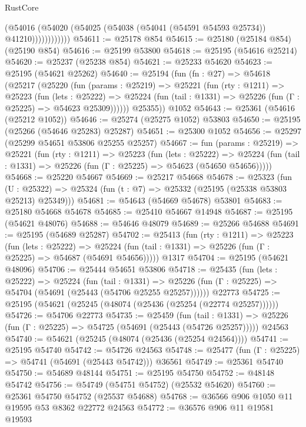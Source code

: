 \begin{lexlean}{RustCore}
\begin{coremodule}
                    (@54016
                      (@54020 (@54025 (@54038 (@54041 (@54591 @54593 @25734)) @41210))))))))))))
@54611 := @25178 @854
@54615 := @25180 (@25184 @854) (@25190 @854)
@54616 := @25199 @53800
@54618 := @25195 (@54616 @25214)
@54620 := @25237 (@25238 @854)
@54621 := @25233 @54620
@54623 := @25195 (@54621 @25262)
@54640 := @25194
    (fun (fn : @27) =>
    @54618
      (@25217
        (@25220
          (fun (params : @25219) =>
          @25221
            (fun (rty : @1211) =>
            @25223
              (fun (lets : @25222) =>
              @25224 (fun (tail : @1331) => @25226 (fun (Γ : @25225) => @54623 @25309))))))
        @25355))
    @1052
@54643 := @25361 (@54616 (@25212 @1052))
@54646 := @25274 (@25275 @1052) @53803
@54650 := @25195 (@25266 (@54646 @25283) @25287)
@54651 := @25300 @1052
@54656 := @25297 (@25299 @54651 @53806 @25255 @25257)
@54667 := fun (params : @25219) =>
  @25221
    (fun (rty : @1211) =>
    @25223
      (fun (lets : @25222) =>
      @25224 (fun (tail : @1331) => @25226 (fun (Γ : @25225) => @54623 (@54650 @54656)))))
@54668 := @25220 @54667
@54669 := @25217 @54668
@54678 := @25323
    (fun (U : @25322) => @25324 (fun (t : @7) => @25332 (@25195 (@25338 @53803 @25213) @25349)))
@54681 := @54643 (@54669 @54678) @53801
@54683 := @25180 @54668 @54678
@54685 := @25410 @54667 @14948
@54687 := @25195 (@54621 @48076)
@54688 := @54646 @48079
@54689 := @25266 @54688
@54691 := @25195 (@54689 @25287)
@54702 := @25413
    (fun (rty : @1211) =>
    @25223
      (fun (lets : @25222) =>
      @25224 (fun (tail : @1331) => @25226 (fun (Γ : @25225) => @54687 (@54691 @54656)))))
    @1317
@54704 := @25195 (@54621 @48096)
@54706 := @25444 @54651 @53806
@54718 := @25435
    (fun (lets : @25222) =>
    @25224
      (fun (tail : @1331) =>
      @25226 (fun (Γ : @25225) => @54704 (@54691 (@25443 (@54706 @25255 @25257))))))
    @22773
@54725 := @25195 (@54621 (@25245 (@48074 (@25436 (@25254 (@22774 @25257))))))
@54726 := @54706 @22773
@54735 := @25459
    (fun (tail : @1331) => @25226 (fun (Γ : @25225) => @54725 (@54691 (@25443 (@54726 @25257)))))
    @24563
@54740 := @54621 (@25245 (@48074 (@25436 (@25254 @24564))))
@54741 := @25195 @54740
@54742 := @54726 @24563
@54748 := @25477 (fun (Γ : @25225) => @54741 (@54691 (@25443 @54742))) @36561
@54749 := @25361 @54740
@54750 := @54689 @48144
@54751 := @25195 @54750
@54752 := @48148 @54742
@54756 := @54749 (@54751 @54752) (@25532 @54620)
@54760 := @25361 @54750 @54752 (@25537 @54688)
@54768 := @36566 @906 @1050 @11 @19595 @53 @8362 @22772 @24563
@54772 := @36576 @906 @11 @19581 @19593

\end{coremodule}
\end{lexlean}
